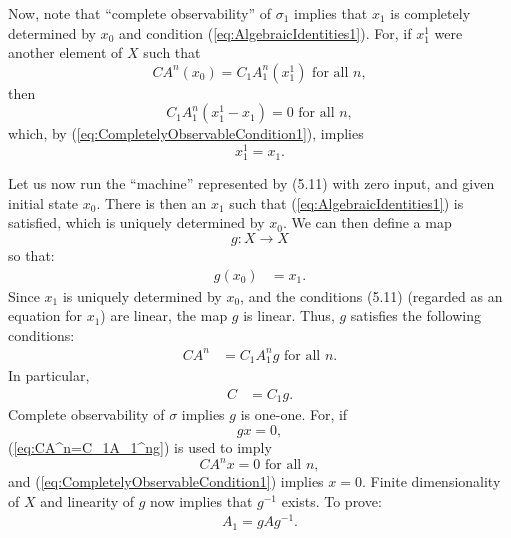 \documentclass[12pt]{book}
\theoremstyle{plain}
\theoremstyle{definition}
\begin{document}
Now, note that ``complete observability'' of $\sigma_1$ implies that $x_1$ is completely determined by $x_0$ and condition (\ref{eq:AlgebraicIdentities1}).
For, if $x_1^1$ were another element of $X$ such that
$$CA^n(x_0) = C_1A_1^n(x_1^1) \text{ for all } n,$$
then
$$C_1A_1^n(x_1^1-x_1) = 0 \text{ for all } n,$$
which, by (\ref{eq:CompletelyObservableCondition1}), implies
$$x_1^1 = x_1.$$

Let us now run the ``machine'' represented by (5.11) with zero input, and given initial state $x_0$. %
There is then an $x_1$ such that (\ref{eq:AlgebraicIdentities1}) is satisfied, which is uniquely determined by $x_0$. We can then define a map
$$g: X \to X$$
so that:
\begin{align} \label{eq:g(x_0)=x_1}
    g(x_0) &= x_1.
\end{align}
Since $x_1$ is uniquely determined by $x_0$, and the conditions (5.11) (regarded as an equation for $x_1$) are linear, the map $g$ is linear. %
Thus, $g$ satisfies the following conditions:
\begin{align} \label{eq:CA^n=C_1A_1^ng}
    CA^n &= C_1A_1^ng \text{ for all } n.
\end{align}
In particular,
\begin{align} \label{eq:C=C_1g}
    C &= C_1g.
\end{align}
Complete observability of $\sigma$ implies $g$ is one-one.
For, if
$$gx = 0,$$
(\ref{eq:CA^n=C_1A_1^ng}) is used to imply
$$CA^nx = 0 \text{ for all } n,$$
and (\ref{eq:CompletelyObservableCondition1}) implies $x = 0$.
Finite dimensionality of $X$ and linearity of $g$ now implies that $g^{-1}$ exists.
To prove:
\begin{align} \label{eq:A_1=gAg^(-1)}
    A_1 = gAg^{-1}.
\end{align}
\end{document}
